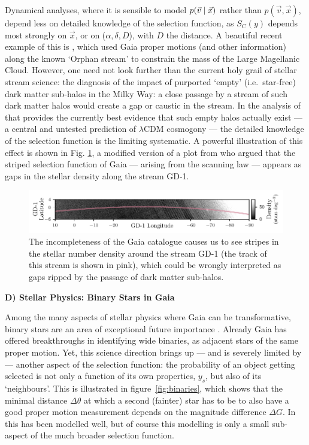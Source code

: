 Dynamical analyses, where it is sensible to model $p(\vec{v}\mid\vec{x})$ rather than $p(\vec{v},\vec{x})$, depend less on detailed knowledge of the selection function, as $S_C(y)$ depends most strongly on $\vec{x}$, or on ($\alpha,\delta,D$), with $D$ the distance. A beautiful recent example of this is \citet{Erkal2019}, which used Gaia proper motions (and other information) along the known `Orphan stream' to constrain the mass of the Large Magellanic Cloud. However, one need not look further than the current holy grail of stellar stream science: the diagnosis of the impact of purported `empty' (i.e.\ star-free) dark matter sub-halos in the Milky Way: a close passage by a stream of such dark matter halos would create a gap or caustic in the stream. In the analysis of \citet{Bonaca2019} that provides the currently best evidence that such empty halos actually exist --- a central and untested prediction of $\lambda$CDM cosmogony --- the detailed knowledge of the selection function is the limiting systematic. A powerful illustration of this effect is shown in Fig. \ref{fig:gd1}, a modified version of a plot from \citet{Ibata2020} who argued that the striped selection function of Gaia --- arising from the scanning law --- appears as gaps in the stellar density along the stream GD-1.
\\

\begin{figure}
    \centering
    \includegraphics[width=\linewidth]{img/gd1plot.pdf}
    \caption{The incompleteness of the Gaia catalogue causes us to see stripes \citep{Ibata2020} in the stellar number density around the stream GD-1 (the track of this stream is shown in pink), which could be wrongly interpreted as gaps ripped by the passage of dark matter sub-halos.}
    \label{fig:gd1}
\end{figure}

\noindent\textbf{D) Stellar Physics: Binary Stars in Gaia}

Among the many aspects of stellar physics where Gaia can be transformative, binary stars are an area of exceptional future importance \citep[e.g.][]{Breivik2019}. Already Gaia has offered breakthroughs in identifying wide binaries, as adjacent stars of the same proper motion. Yet, this science direction brings up --- and is severely limited by --- another aspect of the selection function: the probability of an object getting selected is not only a function of its own properties, $y_s$, but also of its `neighbours'. This is illustrated in figure~\ref{fig:binaries}, which shows that the minimal distance $\Delta\theta$ at which a second (fainter) star has to be to also have a good proper motion measurement depends on the magnitude difference $\Delta G$. In \citet{ElBadry2019} this has been modelled well, but of course this modelling is only a small sub-aspect of the much broader selection function.

